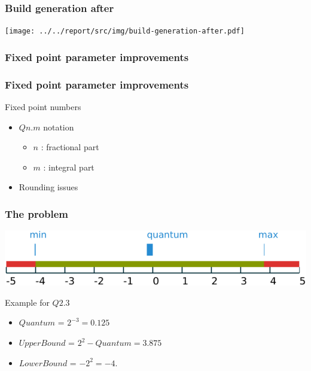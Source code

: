\begin{frame}
    \frametitle{Build generation after}
    \centering
    \texttt{[image: ../../report/src/img/build-generation-after.pdf]}
\end{frame}

\subsubsection{Fixed point parameter improvements}
\begin{frame}
    \frametitle{Fixed point parameter improvements}
    \begin{block}{Fixed point numbers}
        \begin{itemize}
            \item $Qn.m$ notation
                \begin{itemize}
                    \item $n$ : fractional part
                    \item $m$ : integral part
                \end{itemize}
            \item Rounding issues
        \end{itemize}
    \end{block}
\end{frame}

\begin{frame}
    \frametitle{The problem}
    \begin{minipage}{\textwidth}
        \flushright
        \includegraphics[width=\textwidth]{../../report/src/img/fixedPoint.pdf}
    \end{minipage}
    \begin{minipage}{\textwidth}
        \begin{block}{Example for $Q2.3$}
            \begin{itemize}
                \item $Quantum$ = $2^{-3} = 0.125$
                \item $UpperBound$ = $2^2 - Quantum = 3.875$
                \item $LowerBound$ = $-2^2 = -4$.
            \end{itemize}
        \end{block}
    \end{minipage}
\end{frame}

